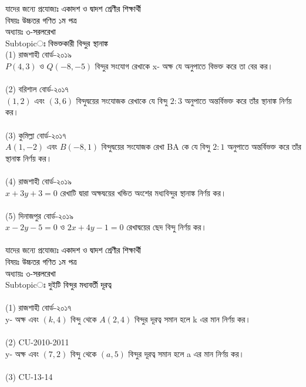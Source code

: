 \documentclass{article}
\begin{document}
 
	\Large
	যাদের জন্যে প্রযোজ্যঃ  	\textcolor{black}{একাদশ ও দ্বাদশ শ্রেণীর শিক্ষার্থী} \\
	বিষয়ঃ \textcolor{black}{উচ্চতর গণিত ১ম পত্র} \\
	অধ্যায়ঃ \textcolor{black}{৩-সরলরেখা }\\ 
	Subtopicঃ \textcolor{black}{বিভক্তকারী বিন্দুর স্থানাঙ্ক }\\	
	(1) রাজশাহী বোর্ড-২০১৯\\
$P(4,3)$ ও $Q(-8,-5)$ বিন্দুর সংযোগ রেখাকে x-  অক্ষ যে অনুপাতে বিভক্ত করে তা বের কর।  \\
	\\
	 (2) বরিশাল বোর্ড-২০১৭\\
$(1,2)$ এবং  $(3,6)$ বিন্দুদ্বয়ের সংযোজক রেখাকে যে বিন্দু $2:3$ অনুপাতে অন্তর্বিভক্ত করে তাঁর স্থানাঙ্ক নির্ণয় কর।  \\
	\\
		(3) কুমিল্লা বোর্ড-২০১৭\\
$A(1,-2)$ এবং  $B(-8,1)$ বিন্দুদ্বয়ের সংযোজক রেখা BA কে  যে বিন্দু $2:1$ অনুপাতে অন্তর্বিভক্ত করে তাঁর স্থানাঙ্ক নির্ণয় কর।  \\
\\
	(4) রাজশাহী বোর্ড-২০১৯\\
 $x+3y+3=0$ রেখাটি দ্বারা অক্ষদ্বয়ের খন্ডিত অংশের মধ্যবিন্দুর স্থানাঙ্ক নির্ণয় কর। \\
 \\
 (5) দিনাজপুর বোর্ড-২০১৯\\ 
 $x-2y-5=0$ ও $2x+4y-1=0$ রেখাদ্বয়ের ছেদ বিন্দু নির্ণয় কর।\\
 \\ 
	যাদের জন্যে প্রযোজ্যঃ  	\textcolor{black}{একাদশ ও দ্বাদশ শ্রেণীর শিক্ষার্থী} \\
বিষয়ঃ \textcolor{black}{উচ্চতর গণিত ১ম পত্র} \\
অধ্যায়ঃ \textcolor{black}{৩-সরলরেখা }\\ 
Subtopicঃ \textcolor{black}{দুইটি বিন্দুর মধ্যবর্তী দূরত্ব }\\	
\\
(1) রাজশাহী বোর্ড-২০১৭\\
y-  অক্ষ এবং $(k,4)$  বিন্দু থেকে $A(2,4)$ বিন্দুর দূরত্ব সমান হলে k  এর মান নির্ণয় কর।\\
\\
(2) CU-2010-2011\\
y-  অক্ষ এবং $(7,2)$  বিন্দু থেকে $(a,5)$ বিন্দুর দূরত্ব সমান হলে a  এর মান নির্ণয় কর।\\
\\
(3) CU-13-14\\
\end{document}
